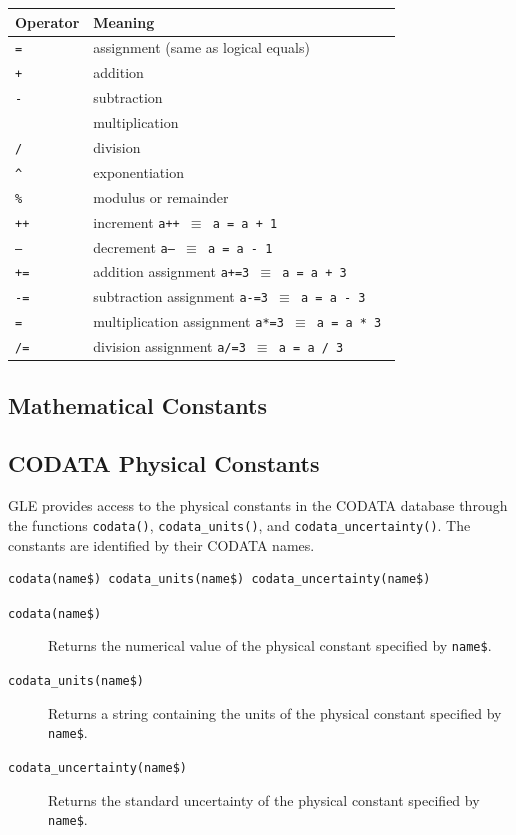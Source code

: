 \begin{tabular}{ll} \hline
Operator & Meaning  \\ \hline
{\tt =} \index{=}    & assignment (same as logical equals) \\
{\tt +} \index{+}    & addition \\
{\tt -} \index{-}    & subtraction \\
{\tt *} \index{*}    & multiplication\\
{\tt /} \index{/}    & division \\
{\tt \textasciicircum } \index{\textasciicircum}  & exponentiation \\
{\tt \%} \index{\%}  & modulus or remainder\\
{\tt ++} \index{++}  & increment {\tt a++ $\equiv$ a = a + 1 }\\
{\tt --} \index{--}  & decrement {\tt a-- $\equiv$ a = a - 1 }\\
{\tt +=} \index{+=}  & addition assignment  {\tt a+=3 $\equiv$ a = a + 3 }\\
{\tt -=} \index{-=}  & subtraction assignment {\tt a-=3 $\equiv$ a = a - 3 }\\
{\tt *=} \index{*=}  & multiplication assignment {\tt a*=3 $\equiv$ a = a * 3 }\\
{\tt /=} \index{/=}  & division assignment {\tt a/=3 $\equiv$ a = a / 3 }\\
\end{tabular}

\vspace{2ex}

\subsection{Mathematical Constants}



\subsection{CODATA Physical Constants}  

GLE provides access to the physical constants in the CODATA database through the functions \texttt{codata()}, \texttt{codata\_units()}, and \texttt{codata\_uncertainty()}. The constants are identified by their CODATA names.

\begin{verbatim}
codata(name$) codata_units(name$) codata_uncertainty(name$)
\end{verbatim}
\begin{description}
\item[\texttt{codata(name\$)}] Returns the numerical value of the physical constant specified by \texttt{name\$}.
\item[\texttt{codata\_units(name\$)}] Returns a string containing the units of the physical constant specified by \texttt{name\$}.
\item[\texttt{codata\_uncertainty(name\$)}] Returns the standard uncertainty of the physical constant specified by \texttt{name\$}.
\end{description}

